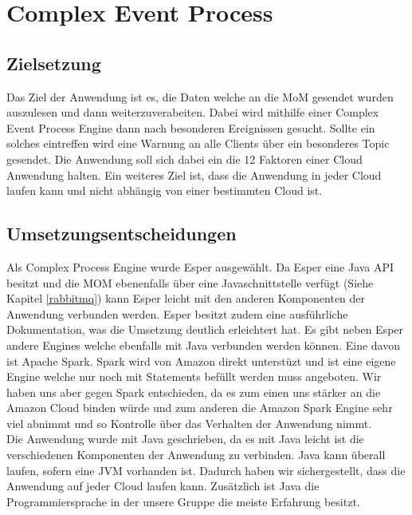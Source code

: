 \section{Complex Event Process}\label{cep}


\subsection{Zielsetzung}
Das Ziel der Anwendung ist es, die Daten welche an die MoM gesendet wurden auszulesen und dann weiterzuverabeiten. Dabei wird mithilfe einer Complex Event Process Engine dann nach besonderen Ereignissen gesucht. Sollte ein solches eintreffen wird eine Warnung an alle Clients über ein besonderes Topic gesendet. Die Anwendung soll sich dabei ein die 12 Faktoren einer Cloud Anwendung halten. Ein weiteres Ziel ist, dass die Anwendung in jeder Cloud laufen kann und nicht abhängig von einer bestimmten Cloud ist. 

\subsection{Umsetzungsentscheidungen}
Als Complex Process Engine wurde Esper ausgewählt. Da Esper eine Java API besitzt und die MOM ebenenfalls über eine Javaschnittstelle verfügt (Siehe Kapitel \ref{rabbitmq}) kann Esper leicht mit den anderen Komponenten der Anwendung verbunden werden. Esper besitzt zudem eine ausführliche Dokumentation, was die Umsetzung deutlich erleichtert hat. Es gibt neben Esper andere Engines welche ebenfalls mit Java verbunden werden können. Eine davon ist Apache Spark. Spark wird von Amazon direkt unterstüzt und ist eine eigene Engine welche nur noch mit Statements befüllt werden muss angeboten. Wir haben uns aber gegen Spark entschieden, da es zum einen uns stärker an die Amazon Cloud binden würde und zum anderen die Amazon Spark Engine sehr viel abnimmt und so Kontrolle über das Verhalten der Anwendung nimmt. 
\\
Die Anwendung wurde mit Java geschrieben, da es mit Java leicht ist die verschiedenen Komponenten der Anwendung zu verbinden. Java kann überall laufen, sofern eine JVM vorhanden ist. Dadurch haben wir sichergestellt, dass die Anwendung auf jeder Cloud laufen kann. Zusätzlich ist Java die Programmiersprache in der unsere Gruppe die meiste Erfahrung besitzt.   

